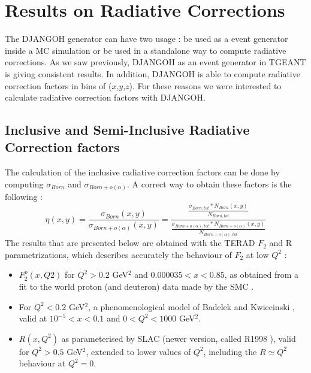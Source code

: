 
\chapter{Results on Radiative Corrections} %

\label{ch:RC} %


The DJANGOH generator can have two usage : be used as a event generator inside a MC simulation or be used in a standalone way to compute radiative corrections. As we saw previously, DJANGOH as an event generator in TGEANT is giving consistent results. In addition, DJANGOH is able to compute radiative correction factors in bins of ($x$,$y$,$z$). For these reasons we were interested to calculate radiative correction factors with DJANGOH.

\section{Inclusive and Semi-Inclusive Radiative Correction factors}\label{sec:RCF}

The calculation of the inclusive radiative correction factors can be done by computing $\sigma_{Born}$ and $\sigma_{Born+o(\alpha)}$. A correct way to obtain these factors is the following :
%
\begin{equation}
  \eta(x,y)=\frac{\sigma_{Born}(x,y)}{\sigma_{Born+o(\alpha)}(x,y)}
  =\frac{\frac{\sigma_{Born,tot}*N_{Born}(x,y)}{N_{Born,tot}}}{\frac{\sigma_{Born+o(\alpha),tot}*N_{Born+o(\alpha)}(x,y)}{N_{Born+o(\alpha),tot}}}
\end{equation}
%
The results that are presented below are obtained with the TERAD $F_{2}$ and R parametrizations, which
describes accurately the behaviour of $F_{2}$ at low $Q^{2}$ \cite{BPnote} :

\begin{itemize}
\item $F^{p}_{2}(x,Q2)$ for $Q^2 > 0.2$ GeV$^2$ and $0.000035 < x < 0.85$, as obtained from a fit to the
world proton (and deuteron) data made by the SMC \cite{SMC}.
\item For $Q^2 < 0.2$ GeV$^2$, a phenomenological model of Badelek and Kwiecinski \cite{BK}, valid at $10^{-5} < x < 0.1$
and $0 < Q^2 < 1000$ GeV$^2$.
\item $R(x, Q^2)$ as parameterised by SLAC (newer version, called R1998 \cite{R1998}), valid for $Q^2 > 0.5$ GeV$^2$, extended
to lower values of $Q^2$, including the $R \simeq Q^2$ behaviour at $Q^2 = 0$.
\end{itemize}

